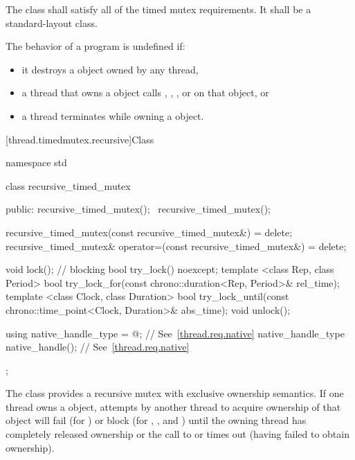 \pnum
The class  shall satisfy all of the timed mutex
requirements. It shall be a standard-layout
class.

\pnum
The behavior of a program is undefined if:

\begin{itemize}
\item it destroys a  object owned by any thread,
\item a thread that owns a  object calls ,
, , or  on that object, or
\item a thread terminates while owning a  object.
\end{itemize}

[thread.timedmutex.recursive]{Class }

%
\begin{codeblock}
namespace std {
  class recursive_timed_mutex {
  public:
    recursive_timed_mutex();
    ~recursive_timed_mutex();

    recursive_timed_mutex(const recursive_timed_mutex&) = delete;
    recursive_timed_mutex& operator=(const recursive_timed_mutex&) = delete;

    void lock();  // blocking
    bool try_lock() noexcept;
    template <class Rep, class Period>
      bool try_lock_for(const chrono::duration<Rep, Period>& rel_time);
    template <class Clock, class Duration>
      bool try_lock_until(const chrono::time_point<Clock, Duration>& abs_time);
    void unlock();

    using native_handle_type = @\impdefnc@; // See~\ref{thread.req.native}
    native_handle_type native_handle();                // See~\ref{thread.req.native}
  };
}
\end{codeblock}

\pnum
The class  provides a recursive mutex with exclusive
ownership semantics. If one thread owns a  object,
attempts by another thread to acquire ownership of that object will fail (for
) or block (for , , and
) until the owning thread has completely released
ownership or the call to  or 
times out (having failed to obtain ownership).

